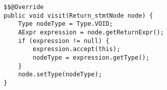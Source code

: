 \begin{lstlisting}[caption={Visit return statement node}, label={code:TC:return}]
$$@Override
public void visit(Return_stmtNode node) {
    Type nodeType = Type.VOID;
    AExpr expression = node.getReturnExpr();
    if (expression != null) {
        expression.accept(this);
        nodeType = expression.getType();
    }
    node.setType(nodeType);
}
\end{lstlisting}
